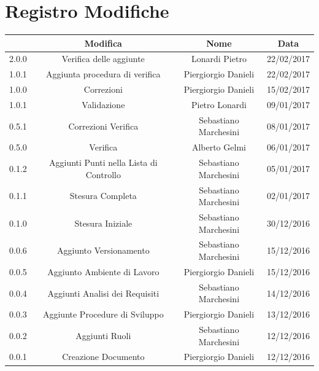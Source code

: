 \documentclass[12pt,a4paper,titlepage]{article}
\begin{document}
	
	
	\clearpage %
	
\chead{}
\cfoot{}
\rfoot{\thepage}
\renewcommand{\headrulewidth}{0.2pt}
\renewcommand{\footrulewidth}{0.2pt}
\section{Registro Modifiche}
\small %
{\renewcommand\arraystretch{1.2}  %
	\begin{center}
	\begin{tabular}{|l|c|c|c|}
			\hline
			{{\textbf{Ver.}}&{\textbf{Modifica}}&{\textbf{Nome}}&{\textbf{Data}}\\
			\hline
			2.0.0 & Verifica delle aggiunte & Lonardi Pietro & 22/02/2017 \\
			\hline
			1.0.1 & Aggiunta procedura di verifica & Piergiorgio Danieli & 22/02/2017 \\
			\hline
			1.0.0 & Correzioni & Piergiorgio Danieli & 15/02/2017 \\
			\hline
			1.0.1 & Validazione & Pietro Lonardi & 09/01/2017 \\
			\hline
			0.5.1 & Correzioni Verifica & Sebastiano Marchesini & 08/01/2017 \\
			\hline
			0.5.0 & Verifica & Alberto Gelmi & 06/01/2017 \\
			\hline
			0.1.2 & Aggiunti Punti nella Lista di Controllo & Sebastiano Marchesini & 05/01/2017 \\
			\hline
			0.1.1 & Stesura Completa & Sebastiano Marchesini & 02/01/2017 \\
			\hline
			0.1.0 & Stesura Iniziale & Sebastiano Marchesini & 30/12/2016 \\
			\hline
			0.0.6 & Aggiunto Versionamento & Sebastiano Marchesini & 15/12/2016 \\
			\hline
			0.0.5 & Aggiunto Ambiente di Lavoro & Piergiorgio Danieli & 15/12/2016 \\
			\hline
			0.0.4 & Aggiunti Analisi dei Requisiti & Sebastiano Marchesini & 14/12/2016 \\
			\hline
			0.0.3 & Aggiunte Procedure di Sviluppo & Piergiorgio Danieli & 13/12/2016 \\
			\hline
			0.0.2 & Aggiunti Ruoli & Sebastiano Marchesini & 12/12/2016 \\
			\hline
			0.0.1 & Creazione Documento & Piergiorgio Danieli & 12/12/2016 \\
			\hline
	\end{tabular}
	\end{center}
}
\normalsize	%
\newpage
\tableofcontents
\thispagestyle{empty}
\newpage
{}
\end{document}
